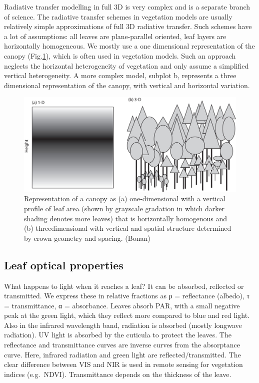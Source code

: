 \documentclass[12pt,oneside]{book}
\begin{document}
Radiative transfer modelling in full 3D is very complex and is a
separate branch of science. The radiative transfer schemes in vegetation
models are usually relatively simple approximations of full 3D radiative
transfer. Such schemes have a lot of assumptions: all leaves are
plane-parallel oriented, leaf layers are horizontally homogeneous. We
mostly use a one dimensional representation of the canopy
(Fig.\ref{fig:f37}), which is often used in vegetation models. Such an
approach neglects the horizontal heterogeneity of vegetation and only
assume a simplified vertical heterogeneity. A more complex model,
subplot b, represents a three dimensional representation of the canopy,
with vertical and horizontal variation.

\begin{figure}

{\centering \includegraphics[width=0.8\linewidth]{figures/chap3/f37_RT_principle} 

}

\caption{Representation of a canopy as (a) one-dimensional with a vertical profile of leaf area (shown by grayscale gradation in which darker shading denotes more leaves) that is horizontally homogenous and (b) threedimensional with vertical and spatial structure determined by crown geometry and spacing. (Bonan)}\label{fig:f37}
\end{figure}

\subsection{Leaf optical properties}\label{leaf-optical-properties}

What happens to light when it reaches a leaf? It can be absorbed,
reflected or transmitted. We express these in relative fractions as ρ =
reflectance (albedo), τ = transmittance, α = absorbance. Leaves absorb
PAR, with a small negative peak at the green light, which they reflect
more compared to blue and red light. Also in the infrared wavelength
band, radiation is absorbed (mostly longwave radiation). UV light is
absorbed by the cuticula to protect the leaves. The reflectance and
transmittance curves are inverse curves from the absorptance curve.
Here, infrared radiation and green light are reflected/transmitted. The
clear difference between VIS and NIR is used in remote sensing for
vegetation indices (e.g.~NDVI). Transmittance depends on the thickness
of the leave.
\end{document}
